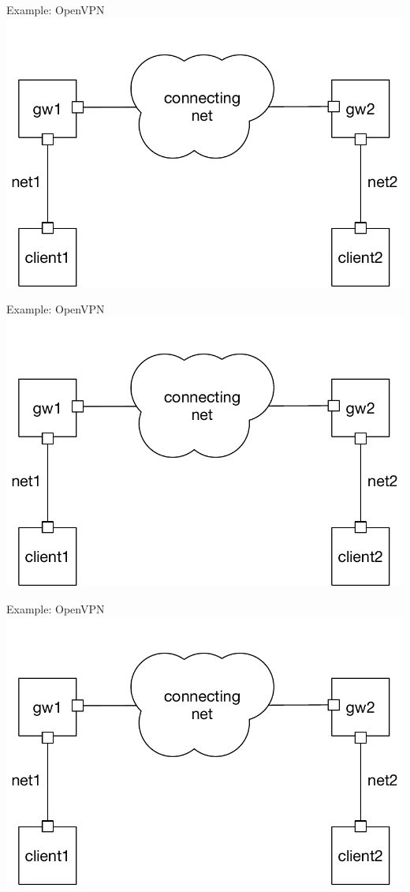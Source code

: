 \documentclass[xcolor=svgnames,17pt]{beamer}
\begin{document}
\begin{frame}{Example: OpenVPN}
\includegraphics[max width=0.9\paperwidth,center,page=2]{OpenVPN.pdf}
\end{frame}

\begin{frame}{Example: OpenVPN}
\includegraphics[max width=0.9\paperwidth,center,page=3]{OpenVPN.pdf}
\end{frame}

\begin{frame}{Example: OpenVPN}
\includegraphics[max width=0.9\paperwidth,center,page=4]{OpenVPN.pdf}
\end{frame}
\end{document}
